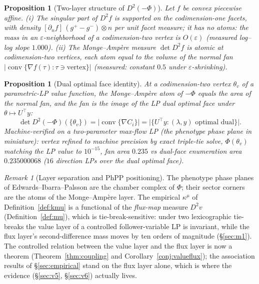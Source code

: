 \documentclass[11pt,a4paper]{article}
\theoremstyle{plain}
\newtheorem{proposition}[theorem]{Proposition}
\theoremstyle{definition}
\theoremstyle{remark}
\newtheorem{remark}[theorem]{Remark}
\newcommand{\kmu}{\kappa^{\mu}}
\begin{document}
\begin{proposition}[Two-layer structure of $D^2(-\Phi)$]\label{prop:twolayer}
Let $f$ be convex piecewise affine. (i) The singular part of $D^2 f$ is
supported on the codimension-one facets, with density
$[\partial_n f]\,(g^+ - g^-) \otimes n$ per unit facet measure; it has no
atoms: the mass in an $\varepsilon$-neighborhood of a codimension-two
vertex is $O(\varepsilon)$ (measured log--log slope $1.000$). (ii) The
Monge--Amp\`ere measure $\det D^2 f$ is atomic at codimension-two
vertices, each atom equal to the volume of the normal fan
$|\operatorname{conv}\{\nabla f(\tau) : \tau \ni \text{vertex}\}|$
(measured: constant $0.5$ under $\varepsilon$-shrinking).
\end{proposition}

\begin{proposition}[Dual optimal face identity]\label{prop:dualface}
At a codimension-two vertex $\theta_v$ of a parametric-LP value function,
the Monge--Amp\`ere atom of $-\Phi$ equals the area of the normal fan, and
the fan is the image of the LP dual optimal face under
$\theta \mapsto U^\top y$:
\[
\det D^2(-\Phi)(\{\theta_v\})
= \bigl|\operatorname{conv}\{\nabla C_i\}\bigr|
= \bigl|\{U^\top y : (\lambda, y) \text{ optimal dual}\}\bigr|.
\]
Machine-verified on a two-parameter max-flow LP (the phenotype phase
plane in miniature): vertex refined to machine precision by exact
triple-tie solve, $\Phi(\theta_v)$ matching the LP value to
$10^{-15}$, fan area $0.235$ vs dual-face enumeration area
$0.235000068$ ($16$ direction LPs over the dual optimal face).
\end{proposition}

\begin{remark}[Layer separation and PhPP positioning]\label{rem:layersep}
The phenotype phase planes of Edwards--Ibarra--Palsson
\citep{edwards2001, ibarra2002} are the chamber
complex of $\Phi$; their sector corners are the atoms of the
Monge--Amp\`ere layer. The empirical $\kmu$ of
Definition~\ref{def:kmu} is a functional of the \emph{flux-map} measure
$D^2 v$ (Definition~\ref{def:mu}), which is tie-break-sensitive: under
two lexicographic tie-breaks the value layer of a controlled
follower-variable LP is invariant, while the flux layer's
second-difference mass moves by ten orders of magnitude (\S\ref{sec:m1}). The
controlled relation between the value layer and the flux layer is now
a theorem (Theorem~\ref{thm:coupling} and
Corollary~\ref{conj:valueflux}); the association results of
\S\ref{sec:empirical} stand on the flux layer alone, which is where
the evidence (\S\ref{sec:v5}, \S\ref{sec:v6}) actually lives.
\end{remark}
\end{document}

